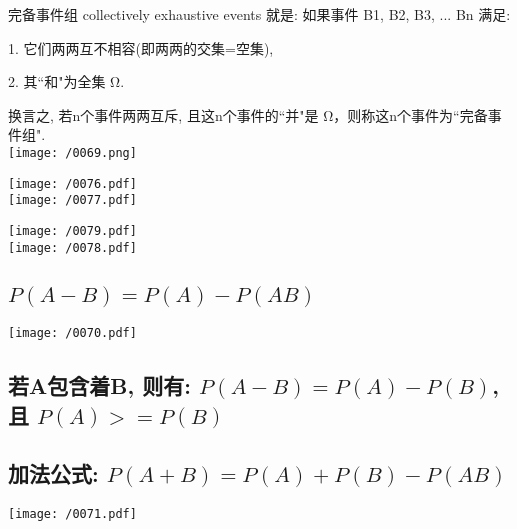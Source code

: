 \documentclass[UTF8]{ctexart}
\begin{document}
	完备事件组 collectively exhaustive events 就是: 如果事件 B1, B2, B3, ...  Bn 满足:
	
	1. 它们两两互不相容(即两两的交集=空集),
	
	2. 其``和"为全集 Ω. 	
	
	换言之, 若n个事件两两互斥, 且这n个事件的``并"是 Ω，则称这n个事件为``完备事件组". \\
	
	\texttt{[image: /0069.png]}
	
	
	\begin{myEnvSample}
\texttt{[image: /0076.pdf]} \\

\texttt{[image: /0077.pdf]}
	\end{myEnvSample}
	\vspace{1em} 
	
	
	\begin{myEnvSample}
	\texttt{[image: /0079.pdf]} \\
		
\texttt{[image: /0078.pdf]} 
	\end{myEnvSample}
	
	
	
	\subsection{$P(A-B) = P(A) - P(AB)$}	
		\texttt{[image: /0070.pdf]}
		
	
	\subsection{若A包含着B, 则有: $ P(A-B) = P(A) - P(B)$, 且 $P(A) >= P(B) $}
	
	
	\subsection{加法公式: $ P(A+B) = P(A) + P(B) - P(AB)$}	
	\texttt{[image: /0071.pdf]} \\
	
\end{document}
